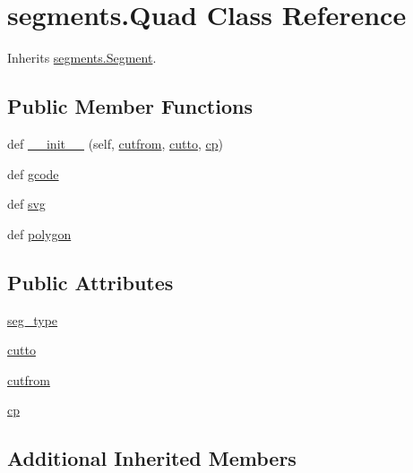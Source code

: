 \hypertarget{classsegments_1_1_quad}{}\section{segments.\+Quad Class Reference}
\label{classsegments_1_1_quad}


Inherits \hyperlink{classsegments_1_1_segment}{segments.\+Segment}.

\subsection*{Public Member Functions}
\begin{DoxyCompactItemize}
\item 
def \hyperlink{classsegments_1_1_quad_a3ed922539b916867e3248c11553f1373}{\+\_\+\+\_\+init\+\_\+\+\_\+} (self, \hyperlink{classsegments_1_1_quad_a8ffff4e377db1600730a73f8ef4c9fe1}{cutfrom}, \hyperlink{classsegments_1_1_quad_ad166ba20f4e5779d9ad8ec66258799b2}{cutto}, \hyperlink{classsegments_1_1_quad_aa240fcc6e8f664bdf01efe2e507b27be}{cp})
\item 
def \hyperlink{classsegments_1_1_quad_ab93f4537c7d8a1757b1629ba0fbae831}{gcode}
\item 
def \hyperlink{classsegments_1_1_quad_a556ff70ecf9d172781370a234e0ebcad}{svg}
\item 
def \hyperlink{classsegments_1_1_quad_ac06297d8460988688d9d6f094dc1ec2e}{polygon}
\end{DoxyCompactItemize}
\subsection*{Public Attributes}
\begin{DoxyCompactItemize}
\item 
\hyperlink{classsegments_1_1_quad_a4bcbb4fe3a385dcfeaa6c4ed9d1bc733}{seg\+\_\+type}
\item 
\hyperlink{classsegments_1_1_quad_ad166ba20f4e5779d9ad8ec66258799b2}{cutto}
\item 
\hyperlink{classsegments_1_1_quad_a8ffff4e377db1600730a73f8ef4c9fe1}{cutfrom}
\item 
\hyperlink{classsegments_1_1_quad_aa240fcc6e8f664bdf01efe2e507b27be}{cp}
\end{DoxyCompactItemize}
\subsection*{Additional Inherited Members}



